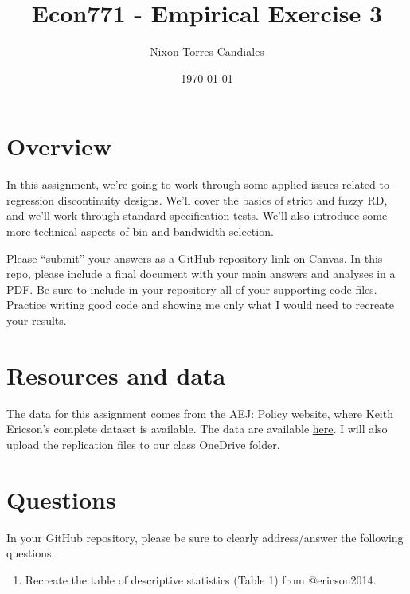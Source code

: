 \documentclass[
  12pt,
]{article}
\title{Econ771 - Empirical Exercise 3}
\author{Nixon Torres Candiales}
\date{\today}
\providecommand{\tightlist}{%
  \setlength{\itemsep}{0pt}\setlength{\parskip}{0pt}}
\begin{document}
\maketitle

\hypertarget{overview}{%
\section{Overview}\label{overview}}

In this assignment, we're going to work through some applied issues
related to regression discontinuity designs. We'll cover the basics of
strict and fuzzy RD, and we'll work through standard specification
tests. We'll also introduce some more technical aspects of bin and
bandwidth selection.

Please ``submit'' your answers as a GitHub repository link on Canvas. In
this repo, please include a final document with your main answers and
analyses in a PDF. Be sure to include in your repository all of your
supporting code files. Practice writing good code and showing me only
what I would need to recreate your results.

\hypertarget{resources-and-data}{%
\section{Resources and data}\label{resources-and-data}}

The data for this assignment comes from the AEJ: Policy website, where
Keith Ericson's complete dataset is available. The data are available
\href{https://www.aeaweb.org/articles?id=10.1257/pol.6.1.38}{here}. I
will also upload the replication files to our class OneDrive folder.

\hypertarget{questions}{%
\section{Questions}\label{questions}}

In your GitHub repository, please be sure to clearly address/answer the
following questions.

\begin{enumerate}
\def\labelenumi{\arabic{enumi}.}
\tightlist
\item
  Recreate the table of descriptive statistics (Table 1) from
  @ericson2014.
\end{enumerate}
\end{document}

